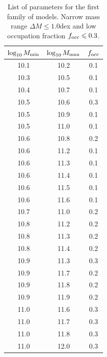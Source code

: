 \documentclass[usenatbib]{mn2e}
\begin{document}
\begin{table}
\begin{center}
\begin{tabular}{ccc}\hline\hline
$\log_{10}M_{\rm min}$ & $\log_{10}M_{\rm max}$ & $f_{\rm occ}$\\\hline
10.1& 10.2& 0.1\\
10.3& 10.5& 0.1\\
10.4& 10.7& 0.1\\
10.5& 10.6& 0.3\\
10.5& 10.9& 0.1\\
10.5& 11.0& 0.1\\
10.6& 10.8& 0.2\\
10.6& 11.2& 0.1\\
10.6& 11.3& 0.1\\
10.6& 11.4& 0.1\\
10.6& 11.5& 0.1\\
10.6& 11.6& 0.1\\
10.7& 11.0& 0.2\\
10.8& 11.2& 0.2\\
10.8& 11.3& 0.2\\
10.8& 11.4& 0.2\\
10.9& 11.3& 0.3\\
10.9& 11.7& 0.2\\
10.9& 11.8& 0.2\\
10.9& 11.9& 0.2\\
11.0& 11.6& 0.3\\
11.0& 11.7& 0.3\\
11.0& 11.8& 0.3\\
11.0& 12.0& 0.3\\\hline\hline
\end{tabular}
\end{center}
\caption{\label{table:thirdfamily}List of parameters for the first
  family of models. Narrow   mass range $\Delta M\leq 1.0$dex and low
  occupation fraction $f_{\rm occ}\leq 0.3$.} 
\end{table}
\end{document}
